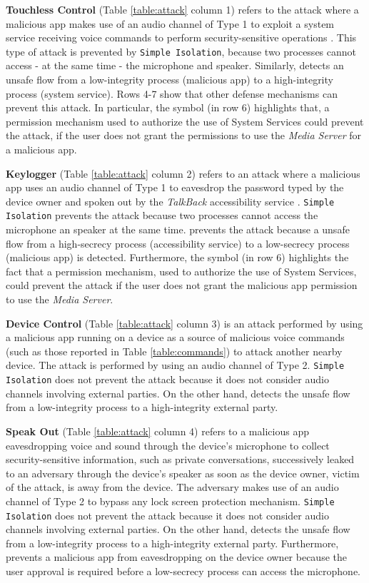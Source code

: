 \textbf{Touchless Control} (Table \ref{table:attack} column 1) refers to the attack where a malicious app makes use of an audio channel of Type 1 to exploit a system service receiving voice commands to perform security-sensitive operations \cite{Jang,Diao}. This type of attack is prevented by \texttt{Simple Isolation}, because two processes cannot access - at the same time - the microphone and speaker. Similarly, \system detects an unsafe flow from a low-integrity process (malicious app) to a high-integrity process (system service). Rows 4-7 show that other defense mechanisms can prevent this attack. In particular, the  symbol (in row 6) highlights that, a permission mechanism used to authorize the use of System Services could prevent the attack, if the user does not grant the permissions to use the {\em Media Server} for a malicious app.

\textbf{Keylogger} (Table \ref{table:attack} column 2) refers to an attack where a malicious app uses an audio channel of Type 1 to eavesdrop the password typed by the device owner and spoken out by the {\em TalkBack} accessibility service \cite{Jang}. \texttt{Simple Isolation} prevents the attack because two processes cannot access the microphone an speaker at the same time. \system prevents the attack because a unsafe flow from a high-secrecy process (accessibility service) to a low-secrecy process (malicious app) is detected. Furthermore, the  symbol (in row 6) highlights the fact that a permission mechanism, used to authorize the use of System Services, could prevent the attack if the user does not grant the malicious app permission to use the {\em Media Server}. 

\textbf{Device Control} (Table \ref{table:attack} column 3) is an attack performed by using a malicious app running on a device as a source of malicious voice commands (such as those reported in Table \ref{table:commands}) to attack another nearby device. The attack is performed by using an audio channel of Type 2. \texttt{Simple Isolation} does not prevent the attack because it does not consider audio channels involving external parties. On the other hand, \system detects the unsafe flow from a low-integrity process to a high-integrity external party. 

\textbf{Speak Out} (Table \ref{table:attack} column 4) refers to a malicious app eavesdropping voice and sound through the device's microphone to collect security-sensitive information, such as private conversations, successively leaked to an adversary through the device's speaker as soon as the device owner, victim of the attack, is away from the device. The adversary makes use of an audio channel of Type 2 to bypass any lock screen protection mechanism. \texttt{Simple Isolation} does not prevent the attack because it does not consider audio channels involving external parties. On the other hand, \system detects the unsafe flow from a low-integrity process to a high-integrity external party. Furthermore, \system prevents a malicious app from eavesdropping on the device owner because the user approval is required before a low-secrecy process can access the microphone.

